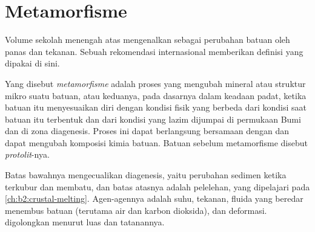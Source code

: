 \section{Metamorfisme}\label{sec:b2:metamorphic-facies:metamorphism}

Volume sekolah menengah atas mengenalkan  sebagai perubahan batuan oleh panas dan
tekanan. Sebuah rekomendasi internasional memberikan definisi yang dipakai di sini.

\begin{definition}\label{def:b2:metamorphic-facies:metamorphism}
Yang disebut \emph{metamorfisme} adalah proses yang mengubah mineral atau
struktur mikro suatu batuan, atau keduanya, pada dasarnya dalam keadaan padat, ketika batuan itu menyesuaikan diri
dengan kondisi fisik yang berbeda dari kondisi saat batuan itu terbentuk dan dari kondisi yang
lazim dijumpai di permukaan Bumi dan di zona diagenesis. Proses ini dapat berlangsung bersamaan dengan
 dan dapat mengubah komposisi kimia batuan. Batuan sebelum
metamorfisme disebut \emph{protolit}-nya.
\end{definition}

Batas bawahnya mengecualikan diagenesis, yaitu perubahan sedimen ketika terkubur dan
membatu, dan batas atasnya adalah pelelehan, yang dipelajari pada \cref{ch:b2:crustal-melting}.
Agen-agennya adalah suhu, tekanan, fluida yang beredar menembus batuan (terutama air dan
karbon dioksida), dan deformasi.  digolongkan menurut luas dan
tatanannya.

